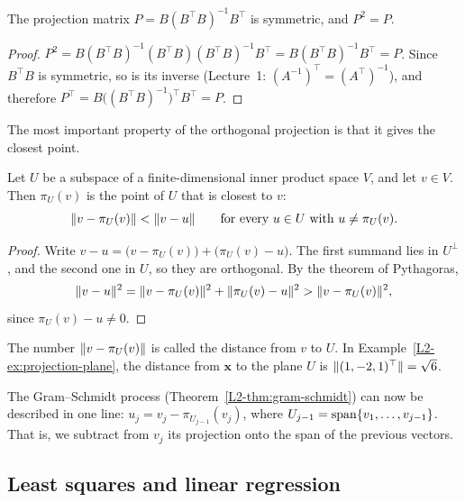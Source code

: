 \begin{proposition}\label{L2-prop:projection-matrix}
    The projection matrix $P = B(B^\top B)^{-1}B^\top$ is symmetric, and $P^2 = P$.
\end{proposition}

\begin{proof}
    $P^2 = B(B^\top B)^{-1} (B^\top B) (B^\top B)^{-1} B^\top = B (B^\top B)^{-1} B^\top = P$. Since $B^\top B$ is symmetric, so is its inverse (Lecture~1: $(A^{-1})^\top = (A^\top)^{-1}$), and therefore $P^\top = B \big((B^\top B)^{-1}\big)^\top B^\top = P$.
\end{proof}

The most important property of the orthogonal projection is that it gives the closest point.

\begin{theorem}\label{L2-thm:best-approximation}
    Let $U$ be a subspace of a finite-dimensional inner product space $V$, and let $v \in V$. Then $\pi_U(v)$ is the point of $U$ that is closest to $v$:
    \[\lVert v - \pi_U(v) \rVert < \lVert v - u \rVert \qquad \text{for every } u \in U \text{ with } u \neq \pi_U(v).\]
\end{theorem}

\begin{proof}
    Write $v - u = \big(v - \pi_U(v)\big) + \big(\pi_U(v) - u\big)$. The first summand lies in $U^\perp$, and the second one in $U$, so they are orthogonal. By the theorem of Pythagoras,
    \[\lVert v - u \rVert^2 = \lVert v - \pi_U(v) \rVert^2 + \lVert \pi_U(v) - u \rVert^2 > \lVert v - \pi_U(v) \rVert^2,\]
    since $\pi_U(v) - u \neq 0$.
\end{proof}

The number $\lVert v - \pi_U(v) \rVert$ is called the distance from $v$ to $U$. In Example~\ref{L2-ex:projection-plane}, the distance from $\mathbf{x}$ to the plane $U$ is $\lVert (1, -2, 1)^\top \rVert = \sqrt{6}$.

\begin{remark}
    The Gram--Schmidt process (Theorem~\ref{L2-thm:gram-schmidt}) can now be described in one line: $u_j = v_j - \pi_{U_{j-1}}(v_j)$, where $U_{j-1} = \operatorname{span}\{v_1, \ldots, v_{j-1}\}$. That is, we subtract from $v_j$ its projection onto the span of the previous vectors.
\end{remark}

\subsection{Least squares and linear regression}\label{L2-sec:least-squares}

